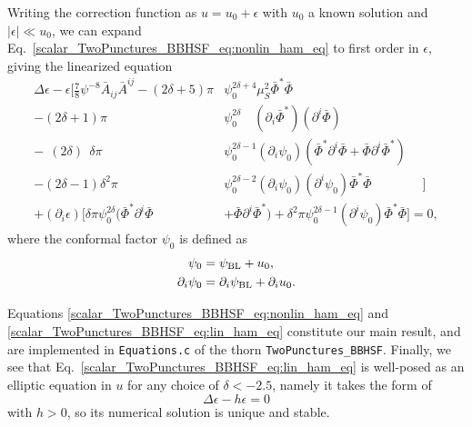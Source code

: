 Writing the correction function as $u = u_0 + \epsilon$ with $u_0$ a known solution
and $|\epsilon|\ll u_0$, 
we can expand Eq.~\eqref{scalar_TwoPunctures_BBHSF_eq:nonlin_ham_eq}
to first order in $\epsilon$, giving
the linearized equation
\begin{align}
    \Delta\epsilon
    - \epsilon
    \Bigg[
        \frac{7}{8} \psi^{-8} \bar{A}_{ij} \bar{A}^{ij}
        - (2\delta + 5) \pi
        &\psi_0^{2\delta + 4}
        \mu_S^2 \bar{\Phi}^* \bar{\Phi}
        \nonumber
        \\
        - (2\delta + 1) \pi
        &\psi_0^{2\delta}\quad
        (\partial_i\bar{\Phi}^*)
        (\partial^i\bar{\Phi})
        \nonumber
        \\
        -\ \ (2\delta)\ \ \delta \pi
        &\psi_0^{2\delta-1} (\partial_i\psi_0)
        ( \bar{\Phi}^* \partial^i\bar{\Phi}
        + \bar{\Phi} \partial^i\bar{\Phi}^* )
        \nonumber
        \\
        - (2\delta-1) \delta^2 \pi
        &\psi_0^{2\delta-2}
        (\partial_i\psi_0) (\partial^i\psi_0)
        \bar{\Phi}^* \bar{\Phi}
    \quad\quad\quad\quad\Big]
    \nonumber
    \\
    + (\partial_i\epsilon)
    \Big[
        \delta \pi \psi_0^{2\delta}
        ( \bar{\Phi}^* \partial^i\bar{\Phi}
        &+ \bar{\Phi} \partial^i\bar{\Phi}^* )
        +
        \delta^2 \pi \psi_0^{2\delta-1} (\partial^i\psi_0)
        \bar{\Phi}^* \bar{\Phi}
    \Big]= 0,
    \label{scalar_TwoPunctures_BBHSF_eq:lin_ham_eq}
\end{align}
where the conformal factor $\psi_0$ is defined as
\begin{align}
    \psi_0
    &= \psi_{\rm BL} + u_0,
    \\
    \partial_i \psi_0
    &= \partial_i \psi_{\rm BL}
    + \partial_i u_0.
\end{align}

Equations \eqref{scalar_TwoPunctures_BBHSF_eq:nonlin_ham_eq} and
\eqref{scalar_TwoPunctures_BBHSF_eq:lin_ham_eq} constitute our main result,
and are implemented in \texttt{Equations.c} of the thorn \texttt{TwoPunctures\_BBHSF}.
Finally, we see that Eq.~\eqref{scalar_TwoPunctures_BBHSF_eq:lin_ham_eq}
is well-posed as an elliptic equation in $u$
for any choice of $\delta < -2.5$,
namely it takes the form of 
\begin{equation}
    \Delta \epsilon - h \epsilon = 0
\end{equation}
with $h>0$,
so its numerical solution is unique and stable.

